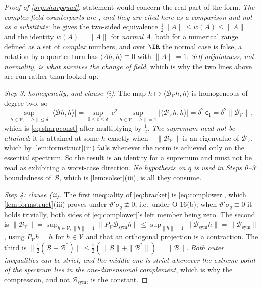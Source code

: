 \begin{proof}[Proof of \cref{prp:sharpquad}]
statement would concern the real part of the form. \emph{The complex-field counterparts are
\citet[\S\S218--219]{halmos1982}, and they are cited here as a comparison and not as a substitute}: he
gives the two-sided equivalence $\tfrac12\|A\|\le w(A)\le\|A\|$ and the identity $w(A)=\|A\|$ for
\emph{normal} $A$, both for a numerical range defined as a set of \emph{complex} numbers, and over $\IR$
the normal case is false, a rotation by a quarter turn has $\langle Ah,h\rangle\equiv0$ with
$\|A\|=1$. \emph{Self-adjointness, not normality, is what survives the change of field}, which is why
the two lines above are run rather than looked up.

\emph{Step 3: homogeneity, and clause \textup{(i)}.} The map
$h\mapsto\langle\mathcal B_{\mathcal V}h,h\rangle$ is homogeneous of degree two, so
\[
\sup_{h\in\mathcal V,\ \|h\|\le\delta}\big|\big\langle\mathcal Bh,h\big\rangle\big|
=\sup_{0\le c\le\delta}\ c^{2}\!\!\sup_{h\in\mathcal V,\|h\|=1}\big|\big\langle\mathcal B_{\mathcal V}h,h\big\rangle\big|
=\delta^{2}\,\mathsf c_1=\delta^{2}\big\|\mathcal B_{\mathcal V}\big\| ,
\]
which is \eqref{eq:sharpconst} after multiplying by $\tfrac12$. \emph{The supremum need not be attained}:
it is attained at some $h$ exactly when $\pm\|\mathcal B_{\mathcal V}\|$ is an eigenvalue of
$\mathcal B_{\mathcal V}$, which by \cref{lem:formstruct}(iii) fails whenever the norm is achieved only on
the essential spectrum. So the result is an identity for a supremum and must not be read as
exhibiting a worst-case direction. \emph{No hypothesis on $q$ is used in Steps 0--3}: boundedness of
$\mathcal B$, which is \cref{lem:solset}(iii), is all they consume.

\emph{Step 4: clause \textup{(ii)}.} The first inequality of \eqref{eq:bracket} is
\eqref{eq:complower}, which \cref{lem:formstruct}(iii) proves under $\vartheta'\sigma_q\not\equiv0$, i.e.\
under O-16(b); when $\vartheta'\sigma_q\equiv0$ it holds trivially, both sides of \eqref{eq:complower}'s
left member being zero. The second is
$\|\mathcal B_{\mathcal V}\|=\sup_{h\in\mathcal V,\|h\|=1}\|P_{\mathcal V}\mathcal B_{\mathrm{sym}}h\|
\le\sup_{\|h\|=1}\|\mathcal B_{\mathrm{sym}}h\|=\|\mathcal B_{\mathrm{sym}}\|$, using $P_{\mathcal V}h=h$
for $h\in\mathcal V$ and that an orthogonal projection is a contraction. The
third is $\|\tfrac12(\mathcal B+\mathcal B^{\ast})\|\le\tfrac12(\|\mathcal B\|+\|\mathcal B^{\ast}\|)=\|\mathcal B\|$.
\emph{Both outer inequalities can be strict, and the middle one is strict whenever the extreme point of
the spectrum lies in the one-dimensional complement}, which is why the compression, and not
$\mathcal B_{\mathrm{sym}}$, is the constant.


\end{proof}
